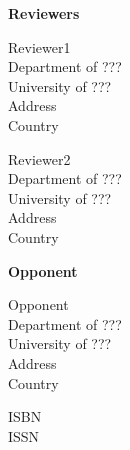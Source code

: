 \documentclass{tucsdissertation}
\begin{document}
\bigskip
\noindent \textbf{\Large Reviewers} \\ \mbox{}

 \parbox[t]{12 cm}{
  Reviewer1\\
  Department of ??? \\
  University of ??? \\
  Address \\
  Country \\ \mbox{}
}

 \parbox[t]{12 cm}{
  Reviewer2\\
  Department of ??? \\
  University of ??? \\
  Address \\
  Country \\ \mbox{}
}

\bigskip
\noindent \textbf{\Large Opponent} \\ \mbox{}

 \parbox[t]{12 cm}{
  Opponent\\
  Department of ??? \\
  University of ??? \\
  Address \\
  Country \\ \mbox{}
}

\vfill
\noindent \parbox[t]{12 cm}{
  ISBN \theisbn \\ 
  ISSN \theissn
}
\clearpage

\pagestyle{plain}
\setcounter{page}{1}


\clearpage



\clearpage

%

\clearpage

\tableofcontents
\cleardoublepage





%
%
\end{document}
